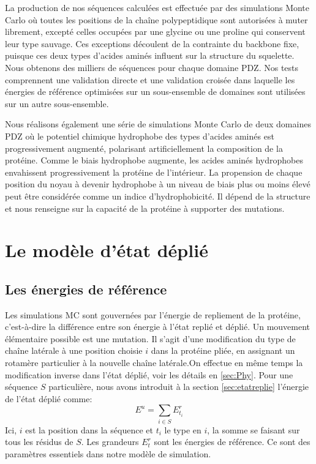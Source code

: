 La production de nos séquences calculées est effectuée par des simulations Monte Carlo où toutes les positions de la chaîne polypeptidique sont autorisées à muter librement, excepté celles occupées par une glycine ou une proline qui conservent leur type sauvage. Ces exceptions découlent de la contrainte du backbone fixe, puisque ces deux types d'acides aminés influent sur la structure du squelette. Nous obtenons des milliers de séquences pour chaque domaine PDZ. Nos tests comprennent une validation directe et une validation croisée dans laquelle les énergies de référence optimisées sur un sous-ensemble de domaines sont utilisées sur un autre sous-ensemble.

Nous réalisons également une série de simulations Monte Carlo de deux domaines PDZ où le potentiel chimique hydrophobe des types d'acides aminés est progressivement augmenté, polarisant artificiellement la composition de la protéine. Comme le biais hydrophobe augmente, les acides aminés hydrophobes envahissent progressivement la protéine de l'intérieur. La propension de chaque position du noyau à devenir hydrophobe à un niveau de biais plus ou moins élevé peut être considérée comme un indice d'hydrophobicité. Il dépend de la structure et nous renseigne sur la capacité de la protéine à supporter des mutations.

\section{Le modèle d'état déplié}
\subsection{Les énergies de référence}
\label{sec:enerref}
Les simulations MC sont gouvernées par l'énergie de repliement de la protéine, c'est-à-dire la différence entre
son énergie à l'état replié et déplié. Un mouvement élémentaire possible est une \og mutation\fg. Il s'agit d'une modification du type de chaîne latérale à une position choisie $i$ dans la protéine pliée, en assignant un rotamère particulier à la nouvelle chaîne latérale.On effectue en même temps la modification inverse dans l'état déplié, voir les détails en \ref{sec:Phy}. Pour une séquence $S$ particulière, nous avons introduit à la section \ref{sec:etatreplie} l'énergie de l'état déplié comme:
\begin{equation}
  E^u=\sum_{i\in S}E^r_{t_i}
  \label{eq:unfolded}
\end{equation} 
Ici, $i$ est la position dans la séquence et $t_i$ le type en $i$, la somme se faisant sur tous les résidus de $S$. Les grandeurs $E_t^r$ sont les  \og énergies de référence\fg. Ce sont des paramètres essentiels dans notre modèle de simulation. 

